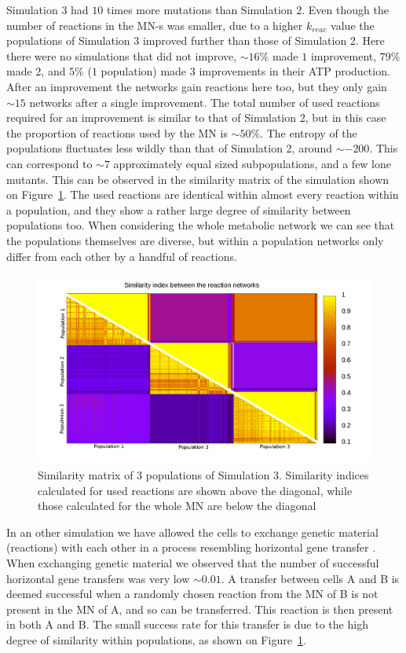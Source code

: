 \documentclass[a4paper,12pt]{article}
\begin{document}
Simulation 3 had $10$ times more mutations than Simulation 2. Even though the number of reactions in the MN-s was smaller, due to a higher $k_{reac}$ value the populations of Simulation 3 improved further than those of Simulation 2. Here there were no simulations that did not improve, $\sim 16\%$ made $1$ improvement, $79\%$ made 2, and $5\%$ ($1$ population) made $3$ improvements in their ATP production. After an improvement the networks gain reactions here too, but they only gain $\sim 15$ networks after a single improvement. The total number of used reactions required for an improvement is similar to that of Simulation 2, but in this case the proportion of reactions used by the MN is $\sim 50\%$. The entropy of the populations fluctuates less wildly than that of Simulation 2, around $\sim -200$. This can correspond to $\sim 7$ approximately equal sized subpopulations, and a few lone mutants. This can be observed in the similarity matrix of the simulation shown on Figure~\ref{fig:simmatrix_sim3}. The used reactions are identical within almost every reaction within a population, and they show a rather large degree of similarity between populations too. When considering the whole metabolic network we can see that the populations themselves are diverse, but within a population networks only differ from each other by a handful of reactions. 




\begin{figure}[htpb]
	\centering
	\includegraphics[width=0.8\linewidth]{simmatrix_sim3.png}
	\caption{Similarity matrix of 3 populations of Simulation 3. Similarity indices calculated for used reactions are shown above the diagonal, while those calculated for the whole MN are below the diagonal}
	\label{fig:simmatrix_sim3}
\end{figure}


In an other simulation we have allowed the cells to exchange genetic material (reactions) with each other in a process resembling horizontal gene transfer \cite{horizontalgenetransfer}. When exchanging genetic material we observed that the number of successful horizontal gene transfers was very low $\sim 0.01$. A transfer between cells A and B is deemed successful when a randomly chosen reaction from the MN of B is not present in the MN of A, and so can be transferred. This reaction is then present in both A and B. The small success rate for this transfer is due to the high degree of similarity within populations, as shown on Figure~\ref{fig:simmatrix_sim3}.
\end{document}
